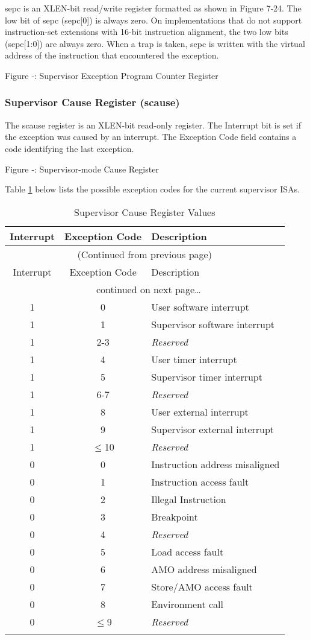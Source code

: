 sepc is an XLEN-bit read/write register formatted as shown in Figure
7‑24. The low bit of sepc (sepc{[}0{]}) is always zero. On
implementations that do not support instruction-set extensions with
16-bit instruction alignment, the two low bits (sepc{[}1:0{]}) are
always zero. When a trap is taken, sepc is written with the virtual
address of the instruction that encountered the exception.

\missingfigure{}

\protect\hypertarget{_Ref367098363}{}{}Figure ‑: Supervisor Exception
Program Counter Register

\subsubsection{Supervisor Cause Register (scause)
}\label{supervisor-cause-register-scause}

The scause register is an XLEN-bit read-only register. The Interrupt bit
is set if the exception was caused by an interrupt. The Exception Code
field contains a code identifying the last exception.

\missingfigure{}

Figure ‑: Supervisor-mode Cause Register

Table \ref{tab:scause-reg-values} below lists the possible exception codes for the current supervisor ISAs.

\begin{longtable}[]{@{}ccl@{}}
\toprule
Interrupt & Exception Code & Description\tabularnewline
\midrule
\endfirsthead
\multicolumn{3}{c}{{(Continued from previous page)}} \\

\toprule
Interrupt & Exception Code & Description\tabularnewline
\midrule
\endhead

\midrule \multicolumn{3}{c}{{\tablename\ \thetable{} continued on next page\ldots}} \\
\endfoot

\endlastfoot

1 & 0 & User software interrupt\tabularnewline
1 & 1 & Supervisor software interrupt\tabularnewline
1 & 2-3 & \emph{Reserved}\tabularnewline
1 & 4 & User timer interrupt\tabularnewline
1 & 5 & Supervisor timer interrupt\tabularnewline
1 & 6-7 & \emph{Reserved}\tabularnewline
1 & 8 & User external interrupt\tabularnewline
1 & 9 & Supervisor external interrupt\tabularnewline
1 & $\leqslant$10 & \emph{Reserved}\tabularnewline
\midrule
0 & 0 & Instruction address misaligned\tabularnewline
0 & 1 & Instruction access fault\tabularnewline
0 & 2 & Illegal Instruction\tabularnewline
0 & 3 & Breakpoint\tabularnewline
0 & 4 & \emph{Reserved}\tabularnewline
0 & 5 & Load access fault\tabularnewline
0 & 6 & AMO address misaligned\tabularnewline
0 & 7 & Store/AMO access fault\tabularnewline
0 & 8 & Environment call\tabularnewline
0 & $\leqslant$9 & \emph{Reserved}\tabularnewline
\bottomrule
\caption{Supervisor Cause Register Values}
\label{tab:scause-reg-values}
\end{longtable}

